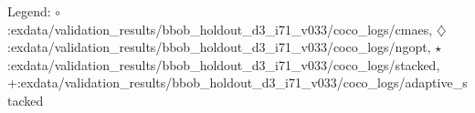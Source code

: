 Legend: {\color{CornflowerBlue}$\circ$}:exdata/validation\_results/bbob\_holdout\_d3\_i71\_v033/coco\_logs/cmaes, {{}$\diamondsuit$}:exdata/validation\_results/bbob\_holdout\_d3\_i71\_v033/coco\_logs/ngopt, {\color{Green}$\star$}:exdata/validation\_results/bbob\_holdout\_d3\_i71\_v033/coco\_logs/stacked, {\color{red}+}:exdata/validation\_results/bbob\_holdout\_d3\_i71\_v033/coco\_logs/adaptive\_stacked